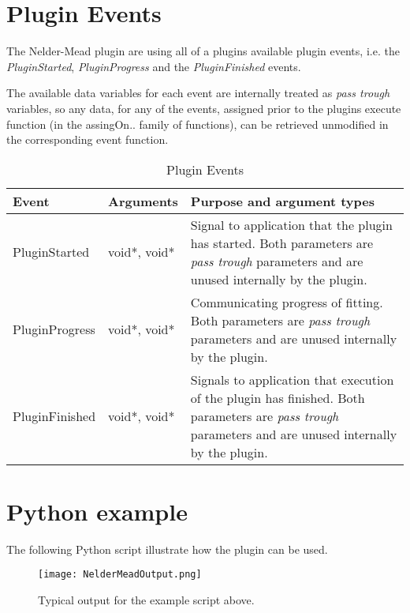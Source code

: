 \section{Plugin Events}
The Nelder-Mead plugin are using all of a plugins available plugin events, i.e. the \emph{PluginStarted}, \emph{PluginProgress} and the \emph{PluginFinished} events.

The available data variables for each event are internally treated as \emph{pass trough} variables, so any data, for any of the events, assigned prior to 
the plugins execute function (in the assingOn.. family of functions), can be retrieved unmodified in the corresponding event function.

\begin{table}[ht]
\centering %
\begin{tabular}{l l p{9cm}} 

Event & Arguments & Purpose and argument types \\ [0.5ex] %
\hline %
PluginStarted  	& 	void*, void*  & Signal to application that the plugin has started. Both parameters are \emph{pass trough} parameters and are unused internally by the plugin.\\[0.5ex]
PluginProgress	& 	void*, void*  & Communicating progress of fitting. Both parameters are \emph{pass trough} parameters and are unused internally by the plugin. \\[0.5ex]
PluginFinished	& 	void*, void*  & Signals to application that execution of the plugin has finished. Both parameters are \emph{pass trough} parameters and are unused internally by the plugin.\\

\hline %
\end{tabular}
\caption{Plugin Events} 
\label{table:nmPluginEvents} 
\end{table}

\section{Python example}
The following Python script illustrate how the plugin can be used. 

\begin{singlespace}

\end{singlespace}

\begin{sidewaysfigure}
\centering
\texttt{[image: NelderMeadOutput.png]}
\caption{Typical output for the example script above.}
\label{fig:nmFig}
\end{sidewaysfigure}






